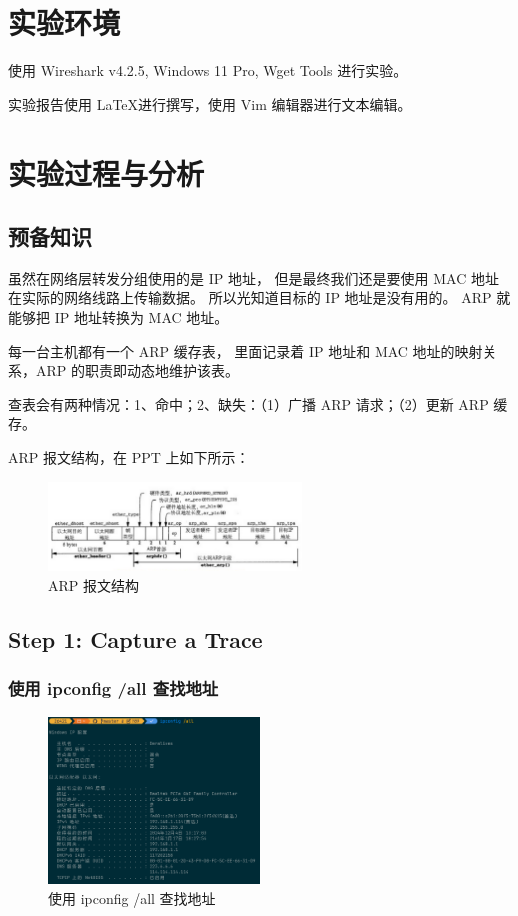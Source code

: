 \documentclass[14pt,a4paper,UTF8,twoside]{article}
\begin{document}
\section{实验环境}

使用 Wireshark v4.2.5, Windows 11 Pro, Wget Tools 进行实验。

实验报告使用 \LaTeX 进行撰写，使用 Vim 编辑器进行文本编辑。

\section{实验过程与分析}

\subsection*{预备知识}

虽然在网络层转发分组使用的是 IP 地址，
但是最终我们还是要使用 MAC 地址在实际的网络线路上传输数据。
所以光知道目标的 IP 地址是没有用的。
ARP 就能够把 IP 地址转换为 MAC 地址。

每一台主机都有一个 ARP 缓存表，
里面记录着 IP 地址和 MAC 地址的映射关系，ARP 的职责即动态地维护该表。

查表会有两种情况：1、命中；2、缺失：（1）广播 ARP 请求；（2）更新 ARP 缓存。

ARP 报文结构，在 PPT 上如下所示：

\begin{figure}[H]
    \centering
    \includegraphics[width=0.6\textwidth]{lab4/arpstructure.png}
    \caption{ARP 报文结构}
\end{figure}

\subsection{Step 1: Capture a Trace}

\subsubsection{使用 ipconfig /all 查找地址}

\begin{figure}[H]
    \centering
    \includegraphics[width=0.5\textwidth]{lab4/ipconfigall.png}
    \caption{使用 ipconfig /all 查找地址}
\end{figure}
\end{document}
